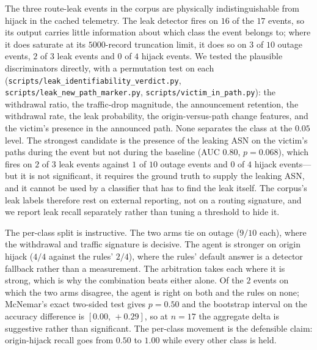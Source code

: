 The three route-leak events in the corpus are physically
indistinguishable from hijack in the cached telemetry. The leak detector
fires on $16$ of the $17$ events, so its output carries little
information about which class the event belongs to; where it does
saturate at its $5000$-record truncation limit, it does so on $3$ of $10$
outage events, $2$ of $3$ leak events and $0$ of $4$ hijack events.
We tested the plausible discriminators directly, with a permutation test
on each (\texttt{scripts/leak\_identifiability\_verdict.py},
\texttt{scripts/leak\_new\_path\_marker.py},
\texttt{scripts/victim\_in\_path.py}): the withdrawal ratio, the
traffic-drop magnitude, the announcement retention, the withdrawal rate,
the leak probability, the origin-versus-path change features, and the
victim's presence in the announced path. None separates the class at
the $0.05$ level. The strongest candidate is the presence of the
leaking ASN on the victim's paths during the event but not during the
baseline (AUC $0.80$, $p=0.068$), which fires on $2$ of $3$ leak events
against $1$ of $10$ outage events and $0$ of $4$ hijack events---but it
is not significant, it requires the ground truth to supply the leaking
ASN, and it cannot be used by a classifier that has to find the leak
itself. The corpus's leak labels therefore rest on external reporting,
not on a routing signature, and we report leak recall separately rather
than tuning a threshold to hide it.

The per-class split is instructive. The two arms tie on outage
($9/10$ each), where the withdrawal and traffic signature is decisive.
The agent is stronger on origin hijack ($4/4$ against the rules' $2/4$),
where the rules' default answer is a detector fallback rather than a
measurement. The arbitration takes each where it is strong, which is why
the combination beats either alone. Of the $2$ events on which the two
arms disagree, the agent is right on both and the rules on none; McNemar's
exact two-sided test gives $p=0.50$ and the bootstrap interval on the
accuracy difference is $[0.00,\,+0.29]$, so at $n=17$ the aggregate delta
is suggestive rather than significant. The per-class movement is the
defensible claim: origin-hijack recall goes from $0.50$ to $1.00$ while
every other class is held.

